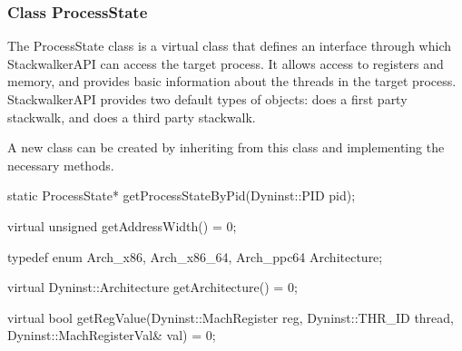 \subsubsection{Class ProcessState}
\label{subsec:processstate}

The ProcessState class is a virtual class that defines an interface through
which StackwalkerAPI can access the target process. It allows access to
registers and memory, and provides basic information about the threads in the
target process. StackwalkerAPI provides two default types of 
objects:  does a first party stackwalk, and  does a third party
stackwalk.

A new  class can be created by inheriting from this class and
implementing the necessary methods.

\begin{apient}
static ProcessState* getProcessStateByPid(Dyninst::PID pid);
\end{apient}


\begin{apient}
virtual unsigned getAddressWidth() = 0;
\end{apient}

\begin{apient}
 typedef enum { Arch_x86, Arch_x86_64, Arch_ppc64 } Architecture;

 virtual Dyninst::Architecture getArchitecture() = 0;
\end{apient}

\begin{apient}
virtual bool getRegValue(Dyninst::MachRegister reg,
                         Dyninst::THR_ID thread,
                         Dyninst::MachRegisterVal& val) = 0;
\end{apient}

